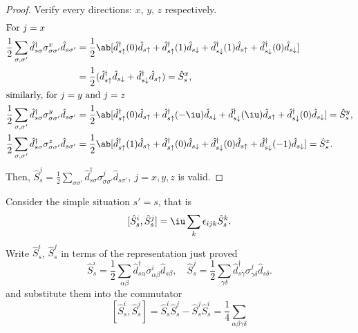 \begin{solution}
\begin{proof}
  Verify every directions: $x$, $y$, $z$ respectively.
    \begin{align*}
  \intertext{For $j = x$}
    \frac12 \sum_{\sigma,\sigma'} \hat d_{s\sigma}^\dagger
    \sigma_{\sigma\sigma'}^x \hat d_{s\sigma'}
  & = \frac12 \ab[\hat d_{s\uparrow}^\dagger(0) \hat d_{s\uparrow}
                + \hat d_{s\uparrow}^\dagger(1) \hat d_{s\downarrow}
                + \hat d_{s\downarrow}^\dagger(1) \hat d_{s\uparrow}
                + \hat d_{s\downarrow}^\dagger(0) \hat d_{s\downarrow}]\\
  & = \frac12 (\hat d_{s\uparrow}^\dagger \hat d_{s\downarrow}
    + \hat d_{s\downarrow}^\dagger \hat d_{s\uparrow}) = \hat S_s^x,\\
  \intertext{similarly, for $j = y$ and $j = z$}
    \frac12 \sum_{\sigma,\sigma'} \hat d_{s\sigma}^\dagger
    \sigma_{\sigma\sigma'}^y \hat d_{s\sigma'}
  & = \frac12 \ab[ \hat d_{s\uparrow}^\dagger(0) \hat d_{s\uparrow}
    + \hat d_{s\uparrow}^\dagger (-\iu) \hat d_{s\downarrow}
    + \hat d_{s\downarrow}^\dagger (\iu) \hat d_{s\uparrow}
    + \hat d_{s\downarrow}^\dagger(0) \hat d_{s\downarrow}]
    = \hat S_s^y,\\
    \frac12 \sum_{\sigma,\sigma'} \hat d_{s\sigma}^\dagger
    \sigma_{\sigma\sigma'}^z \hat d_{s\sigma'}
  & = \frac12 \ab[\hat d_{s\uparrow}^\dagger(1) \hat d_{s\uparrow}
                + \hat d_{s\uparrow}^\dagger(0) \hat d_{s\downarrow}
                + \hat d_{s\downarrow}^\dagger(0) \hat d_{s\uparrow}
                + \hat d_{s\downarrow}^\dagger (-1) \hat d_{s\downarrow}]
    = \hat S_s^z.
    \end{align*}
  Then, $\hat S_s^j = \frac12 \sum_{\sigma\sigma'}
    \hat d_{s\sigma}^\dagger \sigma_{\sigma\sigma'}^j \hat d_{s\sigma'},~
    j = x, y, z$ is valid.
\end{proof}
  Consider the simple situation $s' = s$, that is
  \[
    [\hat S_s^i, \hat S_s^j] = \iu \sum_{k} \epsilon_{ijk} \hat S_s^k.
  \]
  Write $\hat S_s^i$, $\hat S_s^j$ in terms of the representation just proved
  \[
    \hat S_s^i = \frac12 \sum_{\alpha\beta}
    \hat d_{s\alpha}^\dagger \sigma_{\alpha\beta}^i \hat d_{s\beta}, \quad
    \hat S_s^j = \frac12 \sum_{\gamma\delta}
    \hat d_{s\gamma}^\dagger \sigma_{\gamma\delta}^j \hat d_{s\delta}.
  \]
  and substitute them into the commutator
  \[
    [\hat S_s^i, \hat S_s^j]
  = \hat S_s^i \hat S_s^j - \hat S_s^j \hat S_s^i
  = \frac14 \sum_{\alpha\beta\gamma\delta}
\]
\end{solution}
